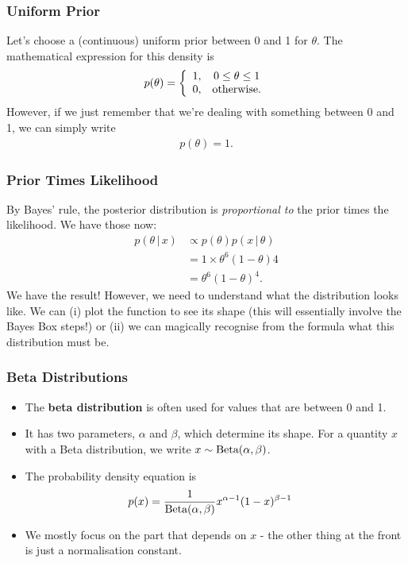 \documentclass{beamer}
\newcommand{\given}{\,|\,}
\begin{document}
\begin{frame}
\frametitle{Uniform Prior}
Let's choose a (continuous) uniform prior between 0 and 1 for $\theta$.
The mathematical expression for this density is
\begin{align}
p(\theta) = \left\{
                \begin{array}{cc}
                1, & 0 \leq \theta \leq 1 \\
                0, & \textnormal{otherwise}.
                \end{array}
            \right.
\end{align}
\pause
However, if we just remember that we're dealing with something between 0 and 1,
we can simply write
\begin{align}
p(\theta) = 1.
\end{align}

\end{frame}

\begin{frame}
\frametitle{Prior Times Likelihood}
By Bayes' rule, the posterior distribution is {\em proportional to}
the prior times the likelihood. We have those now:
\begin{align}
p(\theta \given x) &\propto p(\theta) p(x \given \theta) \\
                   &= 1 \times \theta^6(1-\theta)4 \\
                   &= \theta^6(1-\theta)^4.
\end{align}
\pause
We have the result! However, we need to understand what the distribution
looks like. We can (i) plot the function to see its shape (this will essentially
involve the Bayes Box steps!) or (ii) we can magically recognise from the
formula what this distribution must be.

\end{frame}


\begin{frame}
\frametitle{Beta Distributions}

\begin{itemize}
\item The {\bf beta distribution} is often used for values that are between 0
and 1.\pause
\item It has two parameters, $\alpha$ and $\beta$, which determine its shape.
For a quantity $x$ with a Beta distribution, we write $x \sim \textnormal{Beta}(\alpha, \beta)$.\pause
\item The probability density equation is
\begin{align}
p(x) &= \frac{1}{\textnormal{Beta}(\alpha, \beta)}
            x^{\alpha - 1}(1-x)^{\beta - 1}
\end{align} \pause
\item We mostly focus on the part that depends on $x$ - the other thing
at the front is just a normalisation constant.
\end{itemize}

\end{frame}
\end{document}
